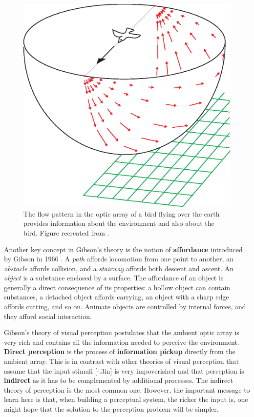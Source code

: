 \begin{figure}[t]
    \centerline{
        \includegraphics[width=0.7\linewidth]{figures/taxonomy/gibson_bird.eps}
    }
    \caption{The flow pattern in the optic array of a bird flying over the earth provides information about the environment and also about the bird. Figure recreated from \cite{Gibson1966}.}
    \label{fig:gibson_bird}
\end{figure}

Another key concept in Gibson's theory is the notion of {\bf affordance} 
introduced by Gibson in 1966 \cite{Gibson1966}. A {\em path} affords locomotion from one point to another, an {\em obstacle} affords collision, and a {\em stairway} affords both descent and ascent.
An {\em object} is a substance enclosed by a surface. The affordance of an object is generally a direct consequence of its properties: a hollow object can contain substances, a detached object affords carrying, an object with a sharp edge affords cutting, and so on. Animate objects are controlled by internal forces, and they afford social interaction.


Gibson's theory of visual perception postulates that the ambient optic array is very rich and contains all the information needed to perceive the environment.  {\bf Direct perception} is the process of {\bf information pickup} directly from the ambient array. This is in contrast with other theories of visual perception that assume that the input stimuli
[-.3in]
is very impoverished and that perception is {\bf indirect} as it has to be complemented by additional processes.
The indirect theory of perception is the most common one. However, the important message to learn here is that, when building a perceptual system, the richer the input is, one might hope that the solution to the perception problem will be simpler.

